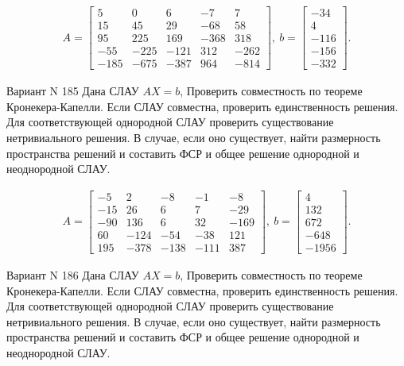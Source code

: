 \documentclass[11pt]{report}
\begin{document}
\begin{align*}
 A = \left[\begin{matrix}5 & 0 & 6 & -7 & 7\\15 & 45 & 29 & -68 & 58\\95 & 225 & 169 & -368 & 318\\-55 & -225 & -121 & 312 & -262\\-185 & -675 & -387 & 964 & -814\end{matrix}\right],
\ b = \left[\begin{matrix}-34\\4\\-116\\-156\\-332\end{matrix}\right]. 
 \end{align*}

Вариант N 185
Дана СЛАУ $AX = b$,
Проверить совместность по теореме Кронекера-Капелли. Если СЛАУ совместна, проверить единственность решения.
Для соответствующей однородной СЛАУ проверить существование нетривиального решения. В случае, если оно существует,
найти размерность пространства решений и составить ФСР и общее решение однородной  и неоднородной СЛАУ.


\begin{align*}
 A = \left[\begin{matrix}-5 & 2 & -8 & -1 & -8\\-15 & 26 & 6 & 7 & -29\\-90 & 136 & 6 & 32 & -169\\60 & -124 & -54 & -38 & 121\\195 & -378 & -138 & -111 & 387\end{matrix}\right],
\ b = \left[\begin{matrix}4\\132\\672\\-648\\-1956\end{matrix}\right]. 
 \end{align*}

Вариант N 186
Дана СЛАУ $AX = b$,
Проверить совместность по теореме Кронекера-Капелли. Если СЛАУ совместна, проверить единственность решения.
Для соответствующей однородной СЛАУ проверить существование нетривиального решения. В случае, если оно существует,
найти размерность пространства решений и составить ФСР и общее решение однородной  и неоднородной СЛАУ.
\end{document}

